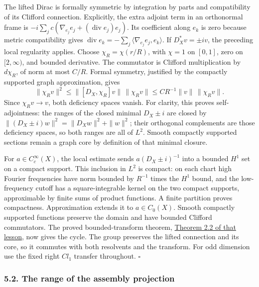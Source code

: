 \documentclass[
  11pt,
]{article}
\begin{document}
The lifted Dirac is formally symmetric by integration by parts and
compatibility of its Clifford connection. Explicitly, the extra adjoint
term in an orthonormal frame is
\(-i\sum_jc(\nabla_{e_j}e_j+(\operatorname{div}e_j)e_j)\). Its
coefficient along \(e_k\) is zero because metric compatibility gives
\(\operatorname{div}e_k=-\sum_j\langle\nabla_{e_j}e_j,e_k\rangle\). If
\(D_X^*v=\pm iv\), the preceding local regularity applies. Choose
\(\chi_R=\chi(r/R)\), with \(\chi=1\) on \([0,1]\), zero on
\([2,\infty)\), and bounded derivative. The commutator is Clifford
multiplication by \(d\chi_R\), of norm at most \(C/R\). Formal symmetry,
justified by the compactly supported graph approximation, gives \[
\|\chi_Rv\|^2
\leq \|[D_X,\chi_R]v\|\,\|\chi_Rv\|
\leq C R^{-1}\|v\|\,\|\chi_Rv\|.
\tag{M4}
\] Since \(\chi_Rv\to v\), both deficiency spaces vanish. For clarity,
this proves self-adjointness: the ranges of the closed minimal
\(D_X\pm i\) are closed by \(\|(D_X\pm i)w\|^2=\|D_Xw\|^2+\|w\|^2\);
their orthogonal complements are those deficiency spaces, so both ranges
are all of \(L^2\). Smooth compactly supported sections remain a graph
core by definition of that minimal closure.

For \(a\in C_c^\infty(X)\), the local estimate sends
\(a(D_X\pm i)^{-1}\) into a bounded \(H^1\) set on a compact support.
This inclusion in \(L^2\) is compact: on each chart high Fourier
frequencies have norm bounded by \(R^{-1}\) times the \(H^1\) bound, and
the low-frequency cutoff has a square-integrable kernel on the two
compact supports, approximable by finite sums of product functions. A
finite partition proves compactness. Approximation extends it to
\(a\in C_0(X)\). Smooth compactly supported functions preserve the
domain and have bounded Clifford commutators. The proved
bounded-transform theorem,
\href{KT-KK-11.html\#2-the-bounded-transform}{Theorem 2.2 of that
lesson}, now gives the cycle. The group preserves the lifted connection
and its core, so it commutes with both resolvents and the transform. For
odd dimension use the fixed right \(Cl_1\) transfer throughout.
\(\square\)

\subsubsection{5.2. The range of the assembly
projection}\label{the-range-of-the-assembly-projection}
\end{document}
